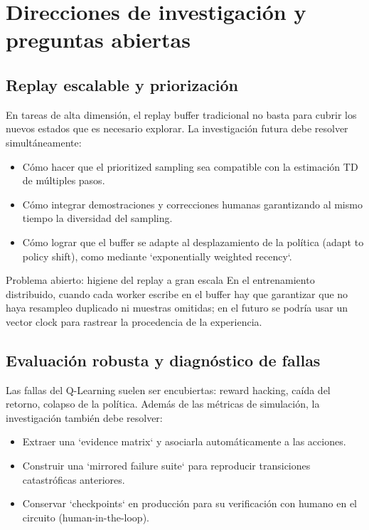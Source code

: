 \section{Direcciones de investigación y preguntas abiertas}

\subsection{Replay escalable y priorización}

En tareas de alta dimensión, el replay buffer tradicional no basta para cubrir los nuevos estados que es necesario explorar. La investigación futura debe resolver simultáneamente:

\begin{itemize}
    \item Cómo hacer que el prioritized sampling sea compatible con la estimación TD de múltiples pasos.
    \item Cómo integrar demostraciones y correcciones humanas garantizando al mismo tiempo la diversidad del sampling.
    \item Cómo lograr que el buffer se adapte al desplazamiento de la política (adapt to policy shift), como mediante `exponentially weighted recency`.
\end{itemize}

\begin{importantbox}{Problema abierto: higiene del replay a gran escala}
En el entrenamiento distribuido, cuando cada worker escribe en el buffer hay que garantizar que no haya resampleo duplicado ni muestras omitidas; en el futuro se podría usar un vector clock para rastrear la procedencia de la experiencia.
\end{importantbox}

\subsection{Evaluación robusta y diagnóstico de fallas}

Las fallas del Q-Learning suelen ser encubiertas: reward hacking, caída del retorno, colapso de la política. Además de las métricas de simulación, la investigación también debe resolver:

\begin{itemize}
    \item Extraer una `evidence matrix` y asociarla automáticamente a las acciones.
    \item Construir una `mirrored failure suite` para reproducir transiciones catastróficas anteriores.
    \item Conservar `checkpoints` en producción para su verificación con humano en el circuito (human-in-the-loop).
\end{itemize}

